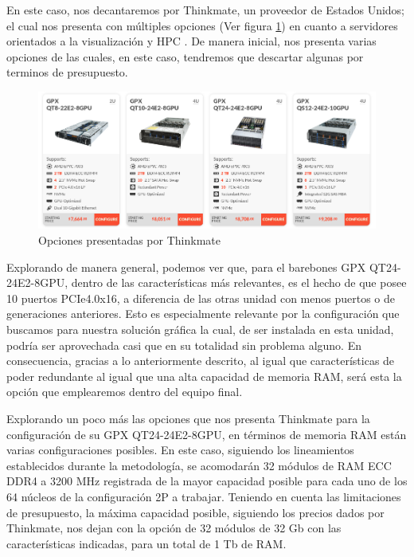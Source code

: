 \documentclass[conference,onecolumn]{IEEEtran}
\newcommand{\cen}{\centering}
\begin{document}
En este caso, nos decantaremos por Thinkmate, un proveedor de Estados Unidos; el cual nos presenta con múltiples opciones (Ver figura \ref{fig:thinkmate}) en cuanto a servidores orientados a la visualización y HPC \cite{thinkmate}. De manera inicial, nos presenta varias opciones de las cuales, en este caso, tendremos que descartar algunas por terminos de presupuesto. \medbreak

\begin{figure}[h!]
  \cen
  \includegraphics[scale=0.5]{think.png}
  \caption{Opciones presentadas por Thinkmate \cite{thinkmate}}
  \label{fig:thinkmate}
\end{figure}

Explorando de manera general, podemos ver que, para el barebones GPX QT24-24E2-8GPU, dentro de las características más relevantes, es el hecho de que posee 10 puertos PCIe4.0x16, a diferencia de las otras unidad con menos puertos o de generaciones anteriores. Esto es especialmente relevante por la configuración que buscamos para nuestra solución gráfica la cual, de ser instalada en esta unidad, podría ser aprovechada casi que en su totalidad sin problema alguno. En consecuencia, gracias a lo anteriormente descrito,  al igual que características de poder redundante al igual que una alta capacidad de memoria RAM, será esta la opción que emplearemos dentro del equipo final. \medbreak

Explorando un poco más las opciones que nos presenta Thinkmate para la configuración de su GPX QT24-24E2-8GPU, en términos de memoria RAM están varias configuraciones posibles. En este caso, siguiendo los lineamientos establecidos durante la metodología, se acomodarán 32 módulos de RAM ECC DDR4 a 3200 MHz registrada de la mayor capacidad posible para cada uno de los 64 núcleos de la configuración 2P a trabajar. Teniendo en cuenta las limitaciones de presupuesto, la máxima capacidad posible, siguiendo los precios dados por Thinkmate, nos dejan con la opción de 32 módulos de 32 Gb con las características indicadas, para un total de 1 Tb de RAM. \medbreak
\end{document}
